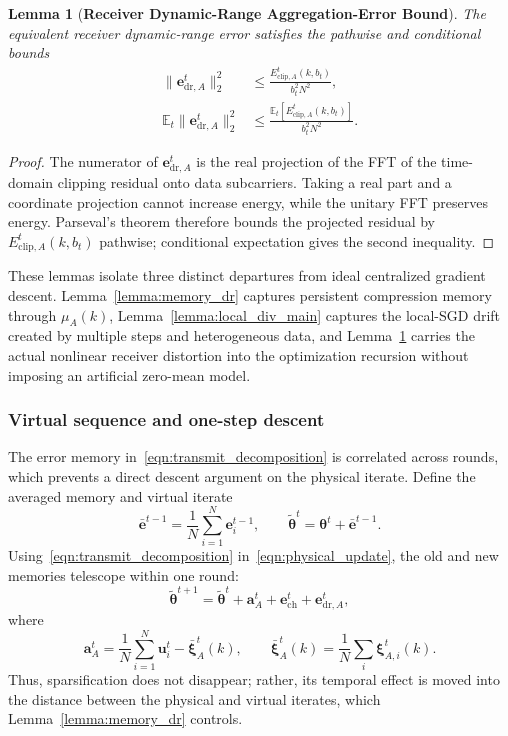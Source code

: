 \documentclass[journal]{IEEEtran}
\newenvironment{revisionblock}{\begingroup\color{revisionred}}{\endgroup}
\newtheorem{lemma}{Lemma}
\begin{document}
\begin{revisionblock}
\begin{lemma}[\bf Receiver Dynamic-Range Aggregation-Error Bound]
\label{lemma:dr_error_main}
The equivalent receiver dynamic-range error satisfies the pathwise and conditional bounds
{
\begin{align}
	\|\mathbf{e}_{\mathrm{dr},A}^t\|_2^2
	&\le\frac{E_{\mathrm{clip},A}^t(k,b_t)}{b_t^2N^2},\\
	\mathbb{E}_t\|\mathbf{e}_{\mathrm{dr},A}^t\|_2^2
	&\le\frac{\mathbb{E}_t[E_{\mathrm{clip},A}^t(k,b_t)]}{b_t^2N^2}.
	\label{eqn:dr_error_conditional}
\end{align}
}
\end{lemma}
\begin{proof}
The numerator of $\mathbf{e}_{\mathrm{dr},A}^t$ is the real projection of the FFT of the time-domain clipping residual onto data subcarriers. Taking a real part and a coordinate projection cannot increase energy, while the unitary FFT preserves energy. Parseval's theorem therefore bounds the projected residual by $E_{\mathrm{clip},A}^t(k,b_t)$ pathwise; conditional expectation gives the second inequality.
\end{proof}

These lemmas isolate three distinct departures from ideal centralized gradient descent. Lemma~\ref{lemma:memory_dr} captures persistent compression memory through $\mu_A(k)$, Lemma~\ref{lemma:local_div_main} captures the local-SGD drift created by multiple steps and heterogeneous data, and Lemma~\ref{lemma:dr_error_main} carries the actual nonlinear receiver distortion into the optimization recursion without imposing an artificial zero-mean model.

\subsubsection{Virtual sequence and one-step descent}
The error memory in~\eqref{eqn:transmit_decomposition} is correlated across rounds, which prevents a direct descent argument on the physical iterate. Define the averaged memory and virtual iterate
{
\begin{equation}
	\bar{\mathbf{e}}^{t-1}=\frac1N\sum_{i=1}^{N}\mathbf{e}_i^{t-1},
	\qquad
	\tilde{\boldsymbol{\theta}}^t
	=\boldsymbol{\theta}^t+\bar{\mathbf{e}}^{t-1}.
	\label{eqn:virtual_iterate}
\end{equation}
}
Using~\eqref{eqn:transmit_decomposition} in~\eqref{eqn:physical_update}, the old and new memories telescope within one round:
{
\begin{equation}
	\tilde{\boldsymbol{\theta}}^{t+1}
	=\tilde{\boldsymbol{\theta}}^t
	+\mathbf{a}_A^t+\mathbf{e}_{\mathrm{ch}}^t
	+\mathbf{e}_{\mathrm{dr},A}^t,
	\label{eqn:virtual_update}
\end{equation}
}
where
{
\begin{equation}
	\mathbf{a}_A^t
	=\frac1N\sum_{i=1}^{N}\mathbf{u}_i^t
	-\bar{\boldsymbol{\xi}}_A^t(k),
	\qquad
	\bar{\boldsymbol{\xi}}_A^t(k)=\frac1N\sum_i\boldsymbol{\xi}_{A,i}^t(k).
\end{equation}
}
Thus, sparsification does not disappear; rather, its temporal effect is moved into the distance between the physical and virtual iterates, which Lemma~\ref{lemma:memory_dr} controls.


\end{revisionblock}
\end{document}
